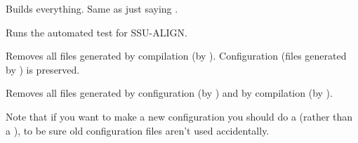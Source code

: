 \begin{sreitems}{}
\item[\emprog{all}]
  Builds everything. Same as just saying .

\item[\emprog{check}]
  Runs the automated test for SSU-ALIGN.

\item[\emprog{clean}]
  Removes all files generated by compilation (by
  ). Configuration (files generated by
  ) is preserved.

\item[\emprog{distclean}]
  Removes all files generated by configuration (by )
  and by compilation (by ). 

  Note that if you want to make a new configuration you
  should do a  (rather than a ), to be sure old configuration files aren't used
  accidentally.
\end{sreitems}

